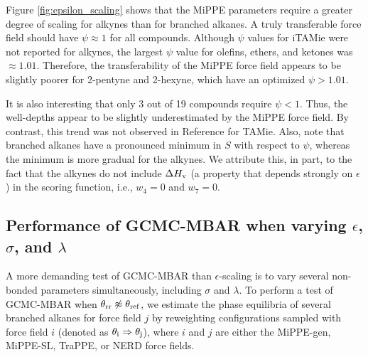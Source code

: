 \documentclass[journal=jced,manuscript=article]{achemso}
\begin{document}
Figure \ref{fig:epsilon_scaling} shows that the MiPPE parameters require a greater degree of scaling for alkynes than for branched alkanes. A truly transferable force field should have $\psi \approx 1$ for all compounds. Although $\psi$ values for iTAMie were not reported for alkynes, the largest $\psi$ value for olefins, ethers, and ketones was $\approx 1.01$.\cite{Weidler2018} Therefore, the transferability of the MiPPE force field appears to be slightly poorer for 2-pentyne and 2-hexyne, which have an optimized $\psi > 1.01$. 

It is also interesting that only 3 out of 19 compounds require $\psi < 1$. Thus, the well-depths appear to be slightly underestimated by the MiPPE force field. By contrast, this trend was not observed in Reference  for TAMie. Also, note that branched alkanes have a pronounced minimum in $S$ with respect to $\psi$, whereas the minimum is more gradual for the alkynes. We attribute this, in part, to the fact that the alkynes do not include $\Delta H_{\rm v}$ (a property that depends strongly on $\epsilon$) in the scoring function, i.e., $w_4 = 0$ and $w_7 = 0$. 


 

\subsection{Performance of GCMC-MBAR when varying $\epsilon$, $\sigma$, and $\lambda$} \label{sec: litFF}
A more demanding test of GCMC-MBAR than $\epsilon$-scaling is to vary several non-bonded parameters simultaneously, including $\sigma$ and $\lambda$. To perform a test of GCMC-MBAR when $\theta_{\rm rr} \not\approx \theta_{\rm ref}$, we estimate the phase equilibria of several branched alkanes for force field $j$ by reweighting configurations sampled with force field $i$ (denoted as $\theta_{\rm i} \Rightarrow \theta_{\rm j}$), where $i$ and $j$ are either the MiPPE-gen, MiPPE-SL, TraPPE, or NERD force fields. 
\end{document}
